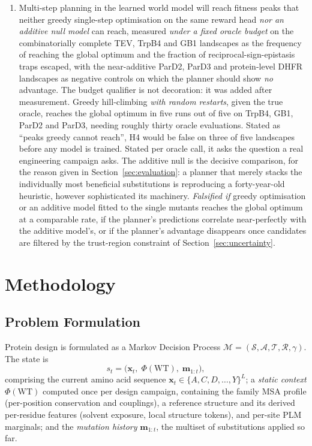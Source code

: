 \documentclass[12pt, a4paper]{article}
\begin{document}
\begin{enumerate}
    \item[\textbf{H4.}] Multi-step planning in the learned world model will reach fitness peaks that neither greedy single-step optimisation on the same reward head \textit{nor an additive null model} can reach, measured \textit{under a fixed oracle budget} on the combinatorially complete TEV, TrpB4 and GB1 landscapes as the frequency of reaching the global optimum and the fraction of reciprocal-sign-epistasis traps escaped, with the near-additive ParD2, ParD3 and protein-level DHFR landscapes as negative controls on which the planner should show \textit{no} advantage. The budget qualifier is not decoration: it was added after measurement. Greedy hill-climbing \textit{with random restarts}, given the true oracle, reaches the global optimum in five runs out of five on TrpB4, GB1, ParD2 and ParD3, needing roughly thirty oracle evaluations. Stated as ``peaks greedy cannot reach'', H4 would be false on three of five landscapes before any model is trained. Stated per oracle call, it asks the question a real engineering campaign asks. The additive null is the decisive comparison, for the reason given in Section~\ref{sec:evaluation}: a planner that merely stacks the individually most beneficial substitutions is reproducing a forty-year-old heuristic, however sophisticated its machinery. \textit{Falsified if} greedy optimisation or an additive model fitted to the single mutants reaches the global optimum at a comparable rate, if the planner's predictions correlate near-perfectly with the additive model's, or if the planner's advantage disappears once candidates are filtered by the trust-region constraint of Section~\ref{sec:uncertainty}.
\end{enumerate}

\section{Methodology}
\label{sec:methodology}

\subsection{Problem Formulation}
\label{sec:formulation}

Protein design is formulated as a Markov Decision Process $\mathcal{M} = (\mathcal{S}, \mathcal{A}, \mathcal{T}, \mathcal{R}, \gamma)$. The state is
\begin{equation*}
    s_t = \big(\mathbf{x}_t,\; \Phi(\mathrm{WT}),\; \mathbf{m}_{1:t}\big),
\end{equation*}
comprising the current amino acid sequence $\mathbf{x}_t \in \{A, C, D, \ldots, Y\}^L$; a \textit{static context} $\Phi(\mathrm{WT})$ computed once per design campaign, containing the family MSA profile (per-position conservation and couplings), a reference structure and its derived per-residue features (solvent exposure, local structure tokens), and per-site PLM marginals; and the \textit{mutation history} $\mathbf{m}_{1:t}$, the multiset of substitutions applied so far.
\end{document}
